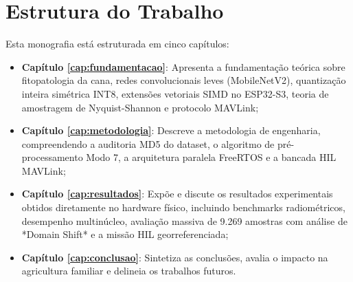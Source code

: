 \section{Estrutura do Trabalho}

Esta monografia está estruturada em cinco capítulos:
\begin{itemize}
    \item \textbf{Capítulo \ref{cap:fundamentacao}}: Apresenta a fundamentação teórica sobre fitopatologia da cana, redes convolucionais leves (MobileNetV2), quantização inteira simétrica INT8, extensões vetoriais SIMD no ESP32-S3, teoria de amostragem de Nyquist-Shannon e protocolo MAVLink;
    \item \textbf{Capítulo \ref{cap:metodologia}}: Descreve a metodologia de engenharia, compreendendo a auditoria MD5 do dataset, o algoritmo de pré-processamento Modo 7, a arquitetura paralela FreeRTOS e a bancada HIL MAVLink;
    \item \textbf{Capítulo \ref{cap:resultados}}: Expõe e discute os resultados experimentais obtidos diretamente no hardware físico, incluindo benchmarks radiométricos, desempenho multinúcleo, avaliação massiva de 9.269 amostras com análise de *Domain Shift* e a missão HIL georreferenciada;
    \item \textbf{Capítulo \ref{cap:conclusao}}: Sintetiza as conclusões, avalia o impacto na agricultura familiar e delineia os trabalhos futuros.
\end{itemize}
